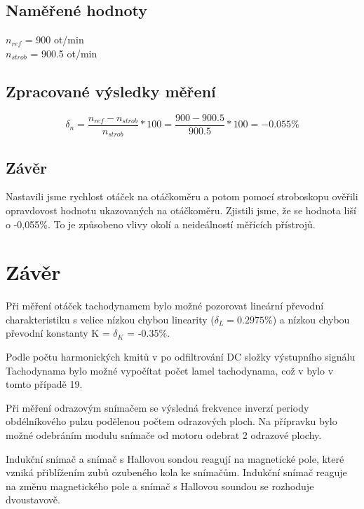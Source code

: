 \documentclass{protokol}
\begin{document}
    \subsection{Naměřené hodnoty}

    $n_{ref}$ = 900 ot/min \\
    $n_{strob}$ = 900.5 ot/min

    \subsection{Zpracované výsledky měření}
    
    \begin{equation} \label{rov:pythagor}
        \delta_{n} = \dfrac{n_{ref}-n_{strob}}{n_{strob}}*100 = \dfrac{900-900.5}{900.5}*100 = -0.055 \%
    \end{equation}


    \subsection{Závěr}
    \noindent Nastavili jsme rychlost otáček na otáčkoměru a potom pomocí stroboskopu ověřili opravdovost hodnotu ukazovaných na otáčkoměru. Zjistili jsme, že se hodnota liší o -0,055\%. To je způsobeno vlivy okolí a neideálností měřících přístrojů.

\pagebreak

\section{Závěr}
    Při měření otáček tachodynamem bylo možné pozorovat lineární převodní charakteristiku s velice nízkou chybou linearity ($\delta_L = 0.2975\% $) a nízkou chybou převodní konstanty K = {$\delta_K$ = -0.35$\%$}.

    Podle počtu harmonických kmitů v po odfiltrování DC složky výstupního signálu Tachodynama bylo možné vypočítat počet lamel tachodynama, což v bylo v tomto případě 19.

    Při měření odrazovým snímačem se výsledná frekvence inverzí periody obdélníkového pulzu podělenou počtem odrazových ploch. Na přípravku bylo možné odebráním modulu snímače od motoru odebrat 2 odrazové plochy.

    Indukční snímač a snímač s Hallovou sondou reagují na magnetické pole, které vzniká přiblížením zubů ozubeného kola ke snímačům. Indukční snímač reaguje na změnu magnetického pole a snímač s Hallovou soundou se rozhoduje dvoustavově.
\end{document}
